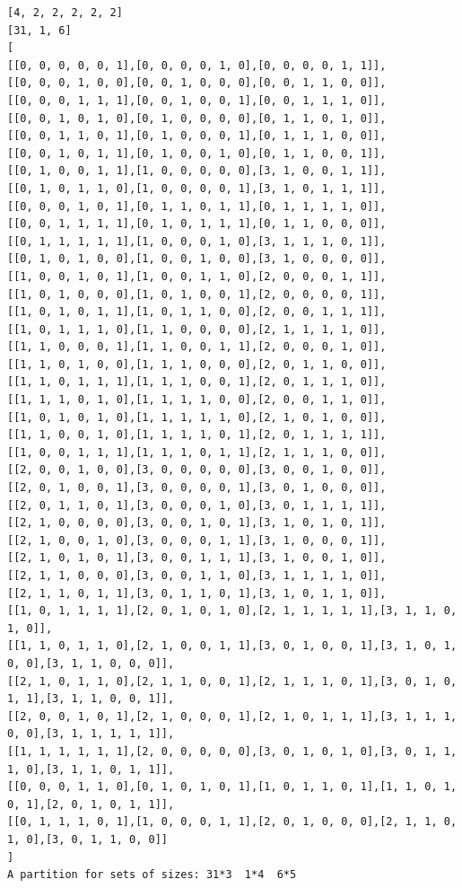 \documentclass[final]{dmtcs-episciences}
\begin{document}
\begin{appendices}
\begin{verbatim} 
[4, 2, 2, 2, 2, 2]
[31, 1, 6]
[
[[0, 0, 0, 0, 0, 1],[0, 0, 0, 0, 1, 0],[0, 0, 0, 0, 1, 1]],
[[0, 0, 0, 1, 0, 0],[0, 0, 1, 0, 0, 0],[0, 0, 1, 1, 0, 0]],
[[0, 0, 0, 1, 1, 1],[0, 0, 1, 0, 0, 1],[0, 0, 1, 1, 1, 0]],
[[0, 0, 1, 0, 1, 0],[0, 1, 0, 0, 0, 0],[0, 1, 1, 0, 1, 0]],
[[0, 0, 1, 1, 0, 1],[0, 1, 0, 0, 0, 1],[0, 1, 1, 1, 0, 0]],
[[0, 0, 1, 0, 1, 1],[0, 1, 0, 0, 1, 0],[0, 1, 1, 0, 0, 1]],
[[0, 1, 0, 0, 1, 1],[1, 0, 0, 0, 0, 0],[3, 1, 0, 0, 1, 1]],
[[0, 1, 0, 1, 1, 0],[1, 0, 0, 0, 0, 1],[3, 1, 0, 1, 1, 1]],
[[0, 0, 0, 1, 0, 1],[0, 1, 1, 0, 1, 1],[0, 1, 1, 1, 1, 0]],
[[0, 0, 1, 1, 1, 1],[0, 1, 0, 1, 1, 1],[0, 1, 1, 0, 0, 0]],
[[0, 1, 1, 1, 1, 1],[1, 0, 0, 0, 1, 0],[3, 1, 1, 1, 0, 1]],
[[0, 1, 0, 1, 0, 0],[1, 0, 0, 1, 0, 0],[3, 1, 0, 0, 0, 0]],
[[1, 0, 0, 1, 0, 1],[1, 0, 0, 1, 1, 0],[2, 0, 0, 0, 1, 1]],
[[1, 0, 1, 0, 0, 0],[1, 0, 1, 0, 0, 1],[2, 0, 0, 0, 0, 1]],
[[1, 0, 1, 0, 1, 1],[1, 0, 1, 1, 0, 0],[2, 0, 0, 1, 1, 1]],
[[1, 0, 1, 1, 1, 0],[1, 1, 0, 0, 0, 0],[2, 1, 1, 1, 1, 0]],
[[1, 1, 0, 0, 0, 1],[1, 1, 0, 0, 1, 1],[2, 0, 0, 0, 1, 0]],
[[1, 1, 0, 1, 0, 0],[1, 1, 1, 0, 0, 0],[2, 0, 1, 1, 0, 0]],
[[1, 1, 0, 1, 1, 1],[1, 1, 1, 0, 0, 1],[2, 0, 1, 1, 1, 0]],
[[1, 1, 1, 0, 1, 0],[1, 1, 1, 1, 0, 0],[2, 0, 0, 1, 1, 0]],
[[1, 0, 1, 0, 1, 0],[1, 1, 1, 1, 1, 0],[2, 1, 0, 1, 0, 0]],
[[1, 1, 0, 0, 1, 0],[1, 1, 1, 1, 0, 1],[2, 0, 1, 1, 1, 1]],
[[1, 0, 0, 1, 1, 1],[1, 1, 1, 0, 1, 1],[2, 1, 1, 1, 0, 0]],
[[2, 0, 0, 1, 0, 0],[3, 0, 0, 0, 0, 0],[3, 0, 0, 1, 0, 0]],
[[2, 0, 1, 0, 0, 1],[3, 0, 0, 0, 0, 1],[3, 0, 1, 0, 0, 0]],
[[2, 0, 1, 1, 0, 1],[3, 0, 0, 0, 1, 0],[3, 0, 1, 1, 1, 1]],
[[2, 1, 0, 0, 0, 0],[3, 0, 0, 1, 0, 1],[3, 1, 0, 1, 0, 1]],
[[2, 1, 0, 0, 1, 0],[3, 0, 0, 0, 1, 1],[3, 1, 0, 0, 0, 1]],
[[2, 1, 0, 1, 0, 1],[3, 0, 0, 1, 1, 1],[3, 1, 0, 0, 1, 0]],
[[2, 1, 1, 0, 0, 0],[3, 0, 0, 1, 1, 0],[3, 1, 1, 1, 1, 0]],
[[2, 1, 1, 0, 1, 1],[3, 0, 1, 1, 0, 1],[3, 1, 0, 1, 1, 0]],
[[1, 0, 1, 1, 1, 1],[2, 0, 1, 0, 1, 0],[2, 1, 1, 1, 1, 1],[3, 1, 1, 0, 1, 0]],
[[1, 1, 0, 1, 1, 0],[2, 1, 0, 0, 1, 1],[3, 0, 1, 0, 0, 1],[3, 1, 0, 1, 0, 0],[3, 1, 1, 0, 0, 0]],
[[2, 1, 0, 1, 1, 0],[2, 1, 1, 0, 0, 1],[2, 1, 1, 1, 0, 1],[3, 0, 1, 0, 1, 1],[3, 1, 1, 0, 0, 1]],
[[2, 0, 0, 1, 0, 1],[2, 1, 0, 0, 0, 1],[2, 1, 0, 1, 1, 1],[3, 1, 1, 1, 0, 0],[3, 1, 1, 1, 1, 1]],
[[1, 1, 1, 1, 1, 1],[2, 0, 0, 0, 0, 0],[3, 0, 1, 0, 1, 0],[3, 0, 1, 1, 1, 0],[3, 1, 1, 0, 1, 1]],
[[0, 0, 0, 1, 1, 0],[0, 1, 0, 1, 0, 1],[1, 0, 1, 1, 0, 1],[1, 1, 0, 1, 0, 1],[2, 0, 1, 0, 1, 1]],
[[0, 1, 1, 1, 0, 1],[1, 0, 0, 0, 1, 1],[2, 0, 1, 0, 0, 0],[2, 1, 1, 0, 1, 0],[3, 0, 1, 1, 0, 0]]
]
A partition for sets of sizes: 31*3  1*4  6*5
\end{verbatim}
\newpage


\end{appendices}
\end{document}
